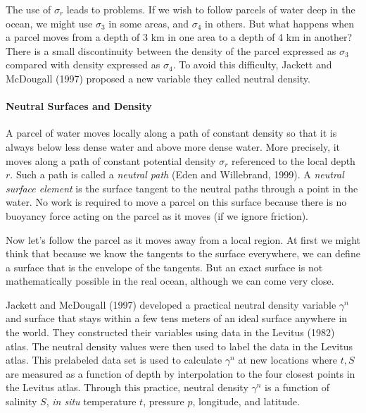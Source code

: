 The use of $\sigma_r$ leads to problems. If we wish to follow parcels of water
deep in the ocean, we might use $\sigma_3$ in some areas, and $\sigma_4$ in others.
But what happens when a parcel moves from a depth of 3 km in one area to a depth of
4 km in another? There is a small discontinuity between the density of the
parcel expressed as $\sigma_3$ compared with density expressed as $\sigma_4$. To
avoid this difficulty, Jackett and McDougall (1997) proposed a new variable they
called neutral density.

\paragraph{Neutral Surfaces and Density}
A parcel of water moves
locally along a path of constant density so that it is always below less dense water and above
more dense water. More precisely, it moves along a path of constant potential
density $\sigma_r$ referenced to the local depth $r$. Such a path is called a
\textit{neutral path} (Eden and Willebrand, 1999). A
\textit{neutral surface element} is the
surface tangent to the neutral paths through a point in the water. No work is
required to move a parcel on this surface because there is no buoyancy force
acting on the parcel as it moves (if we ignore friction).

Now let's follow the parcel as it moves away from a local region. At first we might think that because we know the tangents to the surface everywhere, we can define a surface that is the envelope
of the tangents. But an exact surface is not mathematically possible in the real
ocean, although we can come very close.

Jackett and McDougall (1997) developed a practical neutral density variable
$\gamma^n$ and surface that stays within a few tens meters of an ideal surface
anywhere in the world.  They constructed their variables using data in the Levitus
(1982) atlas. The neutral density values were then used to label the data in the
Levitus atlas. This prelabeled data set is used to calculate $\gamma^n$ at new
locations where $t, S$ are measured as a function of depth by interpolation to
the four closest points in the Levitus atlas. Through this practice, neutral
density $\gamma^n$ is a function of salinity $S$, \textit{in situ} temperature $t$,
pressure $p$, longitude, and latitude.

